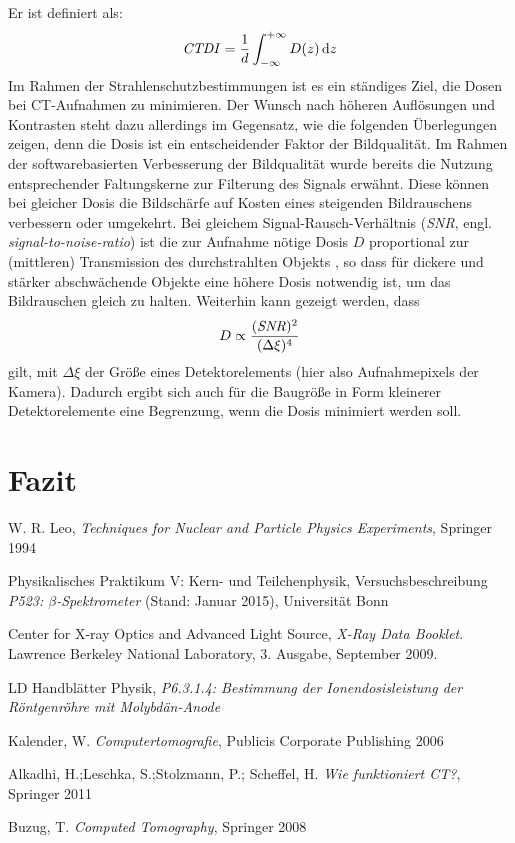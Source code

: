 \documentclass[11pt, a4paper]{article}
\numberwithin{equation}{section}
\begin{document}
Er ist definiert als:
\begin{align}
	\text{\emph{CTDI}}=\frac{1}{d}\int_{-\infty}^{+\infty}D(z)\,\mathrm{d}z
\end{align}
Im Rahmen der Strahlenschutzbestimmungen ist es ein ständiges Ziel, die Dosen bei CT-Aufnahmen zu minimieren.
Der Wunsch nach höheren Auflösungen und Kontrasten steht dazu allerdings im Gegensatz, wie die folgenden Überlegungen zeigen, denn die Dosis ist ein entscheidender Faktor der Bildqualität.
Im Rahmen der softwarebasierten Verbesserung der Bildqualität wurde bereits die Nutzung entsprechender Faltungskerne zur Filterung des Signals erwähnt.
Diese können bei gleicher Dosis die Bildschärfe auf Kosten eines steigenden Bildrauschens verbessern oder umgekehrt.
Bei gleichem Signal-Rausch-Verhältnis (\emph{SNR}, engl. \emph{signal-to-noise-ratio}) ist die zur Aufnahme nötige Dosis $D$ proportional zur (mittleren) Transmission des durchstrahlten Objekts \cite{buzug}, so dass für dickere und stärker abschwächende Objekte eine höhere Dosis notwendig ist, um das Bildrauschen gleich zu halten. 
Weiterhin kann gezeigt werden, dass
\begin{align}
	D \propto \frac{(\text{\emph{SNR}})^2}{(\Delta\xi)^4}
\end{align}
gilt, mit $\Delta\xi$ der Größe eines Detektorelements (hier also Aufnahmepixels der Kamera).
Dadurch ergibt sich auch für die Baugröße in Form kleinerer Detektorelemente eine Begrenzung, wenn die Dosis minimiert werden soll.
\section{Fazit}

\FloatBarrier
\vspace{\fill}
\begin{thebibliography}{19}
	W. R. Leo,
	\emph{Techniques for Nuclear and Particle Physics Experiments},
	Springer 1994

	Physikalisches Praktikum V: Kern- und Teilchenphysik,
	Versuchsbeschreibung \emph{P523: $\beta$-Spektrometer} (Stand: Januar 2015),
	Universität Bonn	

	Center for X-ray Optics and Advanced Light Source,
	\emph{X-Ray Data Booklet}.
	Lawrence Berkeley National Laboratory,
	3. Ausgabe,
	September 2009.

	LD Handblätter Physik,
	\emph{P6.3.1.4: Bestimmung der Ionendosisleistung der Röntgenröhre mit Molybdän-Anode}
	
	Kalender, W.
	\emph{Computertomografie},
	Publicis Corporate Publishing 2006
	
	Alkadhi, H.;Leschka, S.;Stolzmann, P.; Scheffel, H.
	\emph{Wie funktioniert CT?},
	Springer 2011
	
	Buzug, T.
	\emph{Computed Tomography},
	Springer 2008

\end{thebibliography}
\end{document}
